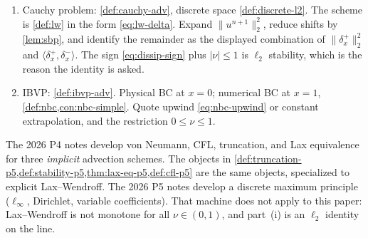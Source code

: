 \begin{examnote}
\label{examnote:p5}
\begin{enumerate}[label=\textup{(\roman*)}]
    \item Cauchy problem: \cref{def:cauchy-adv}, discrete space \cref{def:discrete-l2}. The scheme is \cref{def:lw} in the form \eqref{eq:lw-delta}. Expand \(\|u^{n+1}\|_2^2\), reduce shifts by \cref{lem:sbp}, and identify the remainder as the displayed combination of \(\|\delta_x^+\|_2^2\) and \(\langle\delta_x^+,\delta_x^-\rangle\). The sign \eqref{eq:dissip-sign} plus \(\lvert\nu\rvert\le 1\) is \(\ell_2\) stability, which is the reason the identity is asked.
    \item IBVP: \cref{def:ibvp-adv}. Physical BC at \(x=0\); numerical BC at \(x=1\), \cref{def:nbc,con:nbc-simple}. Quote upwind \eqref{eq:nbc-upwind} or constant extrapolation, and the restriction \(0\le\nu\le 1\).
\end{enumerate}
\end{examnote}

\begin{remark}
\label{rem:p5-vs-2026}
The 2026 P4 notes develop von Neumann, CFL, truncation, and Lax equivalence for three \emph{implicit} advection schemes. The objects in \cref{def:truncation-p5,def:stability-p5,thm:lax-eq-p5,def:cfl-p5} are the same objects, specialized to explicit Lax--Wendroff. The 2026 P5 notes develop a discrete maximum principle (\(\ell_\infty\), Dirichlet, variable coefficients). That machine does not apply to this paper: Lax--Wendroff is not monotone for all \(\nu\in(0,1)\), and part~(i) is an \(\ell_2\) identity on the line.
\end{remark}
